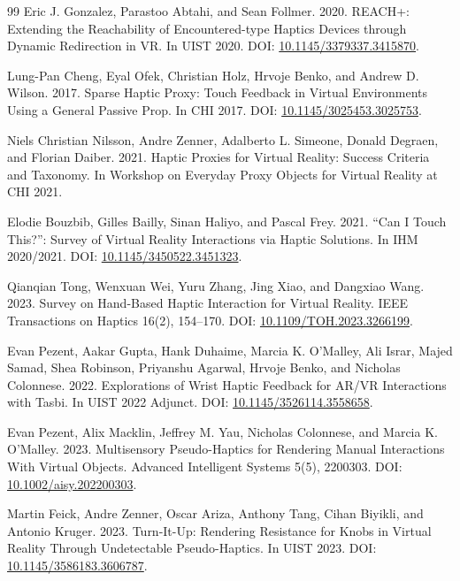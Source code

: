 \documentclass[11pt]{article}
\begin{document}
\begin{thebibliography}{99}
Eric J. Gonzalez, Parastoo Abtahi, and Sean Follmer. 2020. REACH+: Extending the Reachability of Encountered-type Haptics Devices through Dynamic Redirection in VR. In UIST 2020. DOI: \href{https://doi.org/10.1145/3379337.3415870}{10.1145/3379337.3415870}.

Lung-Pan Cheng, Eyal Ofek, Christian Holz, Hrvoje Benko, and Andrew D. Wilson. 2017. Sparse Haptic Proxy: Touch Feedback in Virtual Environments Using a General Passive Prop. In CHI 2017. DOI: \href{https://doi.org/10.1145/3025453.3025753}{10.1145/3025453.3025753}.

Niels Christian Nilsson, Andre Zenner, Adalberto L. Simeone, Donald Degraen, and Florian Daiber. 2021. Haptic Proxies for Virtual Reality: Success Criteria and Taxonomy. In Workshop on Everyday Proxy Objects for Virtual Reality at CHI 2021.

Elodie Bouzbib, Gilles Bailly, Sinan Haliyo, and Pascal Frey. 2021. ``Can I Touch This?'': Survey of Virtual Reality Interactions via Haptic Solutions. In IHM 2020/2021. DOI: \href{https://doi.org/10.1145/3450522.3451323}{10.1145/3450522.3451323}.

Qianqian Tong, Wenxuan Wei, Yuru Zhang, Jing Xiao, and Dangxiao Wang. 2023. Survey on Hand-Based Haptic Interaction for Virtual Reality. IEEE Transactions on Haptics 16(2), 154--170. DOI: \href{https://doi.org/10.1109/TOH.2023.3266199}{10.1109/TOH.2023.3266199}.

Evan Pezent, Aakar Gupta, Hank Duhaime, Marcia K. O'Malley, Ali Israr, Majed Samad, Shea Robinson, Priyanshu Agarwal, Hrvoje Benko, and Nicholas Colonnese. 2022. Explorations of Wrist Haptic Feedback for AR/VR Interactions with Tasbi. In UIST 2022 Adjunct. DOI: \href{https://doi.org/10.1145/3526114.3558658}{10.1145/3526114.3558658}.

Evan Pezent, Alix Macklin, Jeffrey M. Yau, Nicholas Colonnese, and Marcia K. O'Malley. 2023. Multisensory Pseudo-Haptics for Rendering Manual Interactions With Virtual Objects. Advanced Intelligent Systems 5(5), 2200303. DOI: \href{https://doi.org/10.1002/aisy.202200303}{10.1002/aisy.202200303}.

Martin Feick, Andre Zenner, Oscar Ariza, Anthony Tang, Cihan Biyikli, and Antonio Kruger. 2023. Turn-It-Up: Rendering Resistance for Knobs in Virtual Reality Through Undetectable Pseudo-Haptics. In UIST 2023. DOI: \href{https://doi.org/10.1145/3586183.3606787}{10.1145/3586183.3606787}.


\end{thebibliography}
\end{document}
